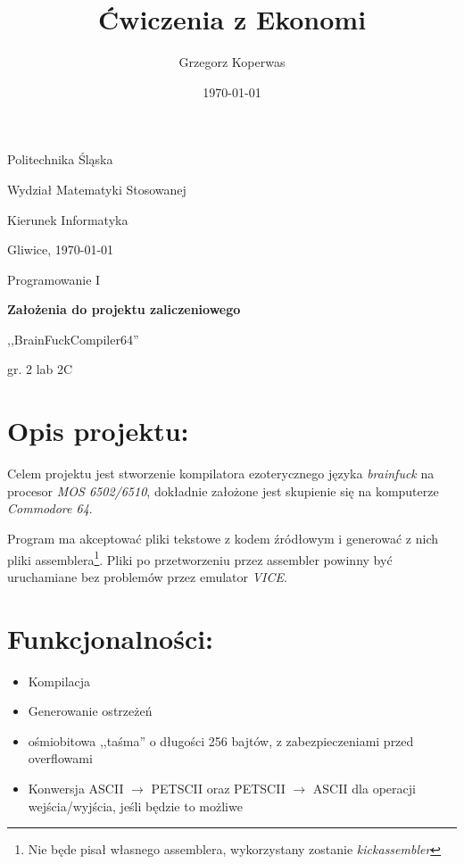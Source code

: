 \documentclass[a4paper,12pt]{article}
\title{Ćwiczenia z Ekonomi}
\author{Grzegorz Koperwas}
\date{\today}
\begin{document}
\begin{titlepage}
    Politechnika Śląska

    Wydział Matematyki Stosowanej

    Kierunek Informatyka


    \begin{center}
        Gliwice, \today

        \vspace{2cm}

        \Large{Programowanie I}

        \vspace{1cm}

        \Large{\bfseries{Założenia do projektu zaliczeniowego}}

        \vspace{1cm}

        \large{,,BrainFuckCompiler64''}

        \vspace{2cm}

        \theauthor{} gr. 2 lab 2C
	\end{center}
	\thispagestyle{empty}
\end{titlepage}

\section{Opis projektu:}
Celem projektu jest stworzenie kompilatora ezoterycznego języka \emph{brainfuck} na procesor \emph{MOS 6502/6510}, dokładnie założone jest skupienie się na komputerze \emph{Commodore 64}.

Program ma akceptować pliki tekstowe z kodem źródłowym i generować z nich pliki assemblera\footnote{Nie będe pisał własnego assemblera, wykorzystany zostanie \emph{kickassembler}}. Pliki po przetworzeniu przez assembler powinny być uruchamiane bez problemów przez emulator \emph{VICE}.

\section{Funkcjonalności:}
\begin{itemize}
    \item Kompilacja
    \item Generowanie ostrzeżeń
    \item ośmiobitowa ,,taśma'' o długości 256 bajtów, z zabezpieczeniami przed overflowami
    \item Konwersja ASCII $\rightarrow$ PETSCII oraz PETSCII $\rightarrow$ ASCII dla operacji wejścia/wyjścia, jeśli będzie to możliwe
\end{itemize}
\end{document}
